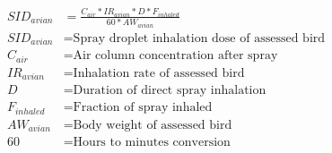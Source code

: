 \documentclass[fleqn, oneside, 11pt]{article}%
\begin{document}
\begin{preview}
\begin{align*}%
SID_{avian} & = \frac{C_{air}*IR_{avian}*D*F_{inhaled}}{60*AW_{avian}}\nonumber \\
SID_{avian} & =  \text{Spray droplet inhalation dose of assessed bird} \nonumber \\
C_{air} & =  \text{Air column concentration after spray} \nonumber \\
IR_{avian} & =  \text{Inhalation rate of assessed bird} \nonumber \\
D & =  \text{Duration of direct spray inhalation} \nonumber \\
F_{inhaled} & =  \text{Fraction of spray inhaled} \nonumber \\
AW_{avian} & =  \text{Body weight of assessed bird} \nonumber \\
60 & =  \text{Hours to minutes conversion} \nonumber \\
\end{align*} 
\end{preview}
\end{document}
